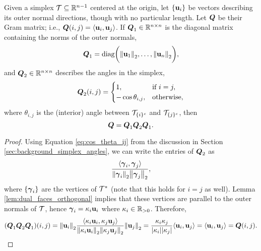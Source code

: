 \begin{lemma}
	Given a simplex $\mathcal{T}\subseteq\mathbb{R}^{n-1}$ centered at the origin, let $\{\vb{u}_i\}$ be vectors describing its outer normal directions, though with no particular length. Let $\vb*{Q}$ be their Gram matrix; i.e., $\vb*{Q}(i,j)=\langle \vb{u}_i,\vb{u}_j\rangle$. If $\vb*{Q}_1\in\mathbb{R}^{n\times n}$ is the diagonal matrix containing the norms of the outer normals, 
	\begin{equation*}
	\vb*{Q}_1 = \text{diag}\bigg(\norm{\vb{u}_1}_2,\dots,\norm{\vb{u}_n}_2\bigg),
	\end{equation*}
	and $\vb*{Q}_2\in\mathbb{R}^{n\times n}$ describes the angles in the simplex, 
	\begin{equation*}
	\vb*{Q}_2(i,j) = \begin{cases}
	1,& \text{if } i=j,\\
	-\cos\theta_{i,j},&\text{otherwise},
	\end{cases} 
	\end{equation*}
	where $\theta_{i,j}$ is the (interior) angle between $\mathcal{T}_{\{i\}^c}$ and $\mathcal{T}_{\{j\}^c}$, then 
	\begin{equation*}
	\vb*{Q} = \vb*{Q}_1 \vb*{Q}_2 \vb*{Q}_1.
	\end{equation*}
\end{lemma}
\begin{proof}
	Using Equation \ref{eq:cos_theta_ij} from the discussion in Section \ref{sec:background_simplex_angles}, we can write the entries of $\vb*{Q}_2$ as 
	\[\frac{\langle \vb*{\gamma}_i,\vb*{\gamma}_j\rangle}{\norm{\vb*{\gamma}_i}_2\norm{\vb*{\gamma}_j}_2},\]
	where $\{\vb*{\gamma}_i\}$ are the vertices of $\mathcal{T}^*$ (note that this holds for $i=j$ as well). Lemma \ref{lem:dual_faces_orthogonal} implies that these vertices are parallel to the outer normals of $\mathcal{T}$, hence  $\vb*{\gamma}_i = \kappa_i \vb{u}_i$ where $\kappa_i\in \mathbb{R}_{> 0}$. Therefore, 
	\begin{equation*}
	(\vb*{Q}_1\vb*{Q}_2\vb*{Q}_1)(i,j) = \norm{\vb{u}_i}_2 \frac{\langle \kappa_i\vb{u}_i,\kappa_j\vb{u}_j\rangle}{\norm{\kappa_i\vb{u}_i}_2\norm{\kappa_j\vb{u}_j}_2}\norm{\vb{u}_j}_2 = \frac{\kappa_i\kappa_j}{|\kappa_i||\kappa_j|}\langle \vb{u}_i,\vb{u}_j\rangle = \langle \vb{u}_i,\vb{u}_j\rangle=\vb*{Q}(i,j).\qedhere
	\end{equation*}
\end{proof}

